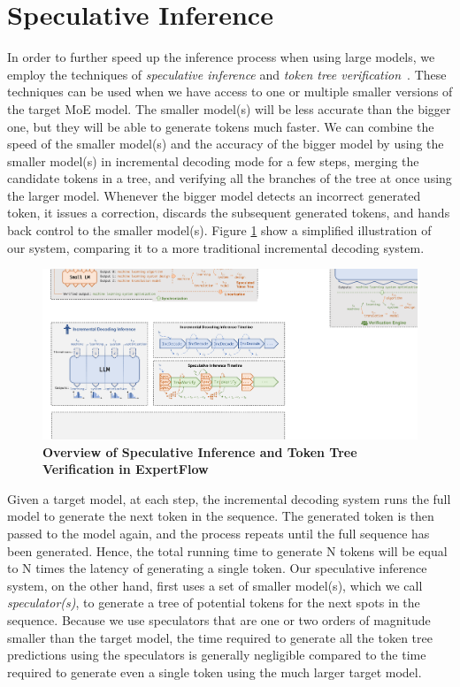 \section{Speculative Inference}\label{design-speculative-inference}
In order to further speed up the inference process when using large models, we employ the techniques of \textit{speculative inference} and \textit{token tree verification}~\cite{miao2023specinfer}. These techniques can be used when we have access to one or multiple smaller versions of the target MoE model. The smaller model(s) will be less accurate than the bigger one, but they will be able to generate tokens much faster. We can combine the speed of the smaller model(s) and the accuracy of the bigger model by using the smaller model(s) in incremental decoding mode for a few steps, merging the candidate tokens in a tree, and verifying all the branches of the tree at once using the larger model. Whenever the bigger model detects an incorrect generated token, it issues a correction, discards the subsequent generated tokens, and hands back control to the smaller model(s). Figure \ref{fig:spec-inference-overview} show a simplified illustration of our system, comparing it to a more traditional incremental decoding system. 

\begin{figure}[H]
    \centering
    \includegraphics[width=0.85\linewidth]{figures/existing_overview6b3.pdf}
    \caption{\textbf{Overview of Speculative Inference and Token Tree Verification in ExpertFlow}}
    \label{fig:spec-inference-overview}
\end{figure}

Given a target model, at each step, the incremental decoding system runs the full model to generate the next token in the sequence. The generated token is then passed to the model again, and the process repeats until the full sequence has been generated. Hence, the total running time to generate N tokens will be equal to N times the latency of generating a single token. Our speculative inference system, on the other hand, first uses a set of smaller model(s), which we call \textit{speculator(s)}, to generate a tree of potential tokens for the next spots in the sequence. Because we use speculators that are one or two orders of magnitude smaller than the target model, the time required to generate all the token tree predictions using the speculators is generally negligible compared to the time required to generate even a single token using the much larger target model. 

